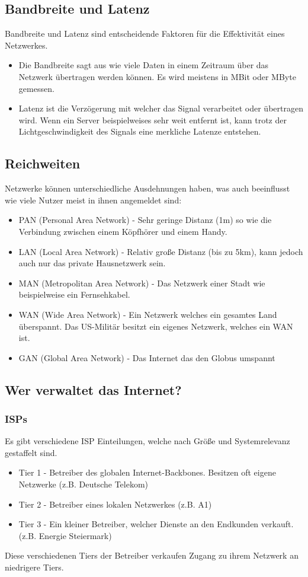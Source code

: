 \documentclass{article}
\begin{document}
	 \subsection{Bandbreite und Latenz}
	 Bandbreite und Latenz sind entscheidende Faktoren für die Effektivität eines Netzwerkes.\\
	 \begin{itemize}
	 	\item{Die Bandbreite sagt aus wie viele Daten in einem Zeitraum über das Netzwerk übertragen werden können. Es wird meistens in MBit oder MByte gemessen.}
	 	\item{Latenz ist die Verzögerung mit welcher das Signal verarbeitet oder übertragen wird. Wenn ein Server beispielweises sehr weit entfernt ist, kann trotz der Lichtgeschwindigkeit des Signals eine merkliche Latenze entstehen.}
	 \end{itemize}
	 \subsection{Reichweiten}
	 Netzwerke können unterschiedliche Ausdehnungen haben, was auch beeinflusst wie viele Nutzer meist in ihnen angemeldet sind:
	 \begin{itemize}
	 	\item{PAN (Personal Area Network) - Sehr geringe Distanz (1m) so wie die Verbindung zwischen einem Köpfhörer und einem Handy.}
	 	\item{LAN (Local Area Network) - Relativ große Distanz (bis zu 5km), kann jedoch auch nur das private Hausnetzwerk sein.}
	 	\item{MAN (Metropolitan Area Network) - Das Netzwerk einer Stadt wie beispielweise ein Fernsehkabel.}
	 	\item{WAN (Wide Area Network) - Ein Netzwerk welches ein gesamtes Land überspannt. Das US-Militär besitzt ein eigenes Netzwerk, welches ein WAN ist.}
	 	\item{GAN (Global Area Network) - Das Internet das den Globus umspannt}
	 \end{itemize}
	 \subsection{Wer verwaltet das Internet?}
	 \subsubsection{ISPs}
	 Es gibt verschiedene ISP Einteilungen, welche nach Größe und Systemrelevanz gestaffelt sind.
	 \begin{itemize}
	 	\item{Tier 1 - Betreiber des globalen Internet-Backbones. Besitzen oft eigene Netzwerke (z.B. Deutsche Telekom)}
	 	\item{Tier 2 - Betreiber eines lokalen Netzwerkes (z.B. A1)}
	 	\item{Tier 3 - Ein kleiner Betreiber, welcher Dienste an den Endkunden verkauft. (z.B. Energie Steiermark)}
	 \end{itemize}
	 Diese verschiedenen Tiers der Betreiber verkaufen Zugang zu ihrem Netzwerk an niedrigere Tiers.
\end{document}
